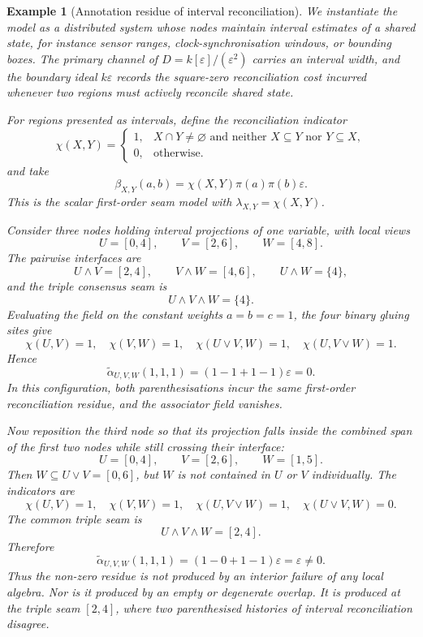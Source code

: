 \documentclass[11pt]{article}
\newtheorem{example}[theorem]{Example}
\begin{document}
\begin{example}[Annotation residue of interval reconciliation]
We instantiate the model as a distributed system whose nodes maintain interval estimates of a shared state, for instance sensor ranges, clock-synchronisation windows, or bounding boxes. The primary channel of \(D=k[\varepsilon]/(\varepsilon^2)\) carries an interval width, and the boundary ideal \(k\varepsilon\) records the square-zero reconciliation cost incurred whenever two regions must actively reconcile shared state.

For regions presented as intervals, define the reconciliation indicator
\[
\chi(X,Y)=
\begin{cases}
1, & X\cap Y\neq \varnothing\text{ and neither }X\subseteq Y\text{ nor }Y\subseteq X,\\
0, & \text{otherwise.}
\end{cases}
\]
and take
\[
\beta_{X,Y}(a,b)=\chi(X,Y)\pi(a)\pi(b)\varepsilon.
\]
This is the scalar first-order seam model with \(\lambda_{X,Y}=\chi(X,Y)\).

Consider three nodes holding interval projections of one variable, with local views
\[
U=[0,4],
\qquad
V=[2,6],
\qquad
W=[4,8].
\]
The pairwise interfaces are
\[
U\wedge V=[2,4],
\qquad
V\wedge W=[4,6],
\qquad
U\wedge W=\{4\},
\]
and the triple consensus seam is
\[
U\wedge V\wedge W=\{4\}.
\]
Evaluating the field on the constant weights \(a=b=c=1\), the four binary gluing sites give
\[
\chi(U,V)=1,
\quad
\chi(V,W)=1,
\quad
\chi(U\vee V,W)=1,
\quad
\chi(U,V\vee W)=1.
\]
Hence
\[
\widetilde\alpha_{U,V,W}(1,1,1)
=(1-1+1-1)\varepsilon=0.
\]
In this configuration, both parenthesisations incur the same first-order reconciliation residue, and the associator field vanishes.

Now reposition the third node so that its projection falls inside the combined span of the first two nodes while still crossing their interface:
\[
U=[0,4],
\qquad
V=[2,6],
\qquad
W=[1,5].
\]
Then \(W\subseteq U\vee V=[0,6]\), but \(W\) is not contained in \(U\) or \(V\) individually. The indicators are
\[
\chi(U,V)=1,
\quad
\chi(V,W)=1,
\quad
\chi(U,V\vee W)=1,
\quad
\chi(U\vee V,W)=0.
\]
The common triple seam is
\[
U\wedge V\wedge W=[2,4].
\]
Therefore
\[
\widetilde\alpha_{U,V,W}(1,1,1)
=(1-0+1-1)\varepsilon
=\varepsilon\neq 0.
\]
Thus the non-zero residue is not produced by an interior failure of any local algebra. Nor is it produced by an empty or degenerate overlap. It is produced at the triple seam \([2,4]\), where two parenthesised histories of interval reconciliation disagree.
\end{example}
\end{document}
